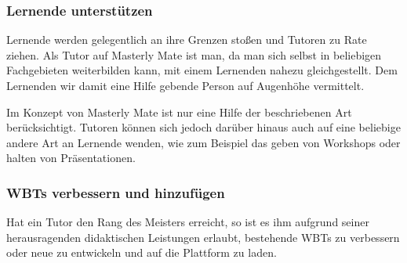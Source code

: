 \subsubsection{Lernende unterstützen}
Lernende werden gelegentlich an ihre Grenzen stoßen und Tutoren zu Rate ziehen.
Als Tutor auf Masterly Mate ist man, da man sich selbst in beliebigen
Fachgebieten weiterbilden kann, mit einem Lernenden nahezu gleichgestellt. Dem
Lernenden wir damit eine Hilfe gebende Person auf Augenhöhe vermittelt. 

Im Konzept von Masterly Mate ist nur eine Hilfe der beschriebenen Art
berücksichtigt. Tutoren können sich jedoch darüber hinaus auch auf eine
beliebige andere Art an Lernende wenden, wie zum Beispiel das geben von
Workshops oder halten von Präsentationen.

\subsubsection{WBTs verbessern und hinzufügen}
Hat ein Tutor den Rang des Meisters erreicht, so ist es ihm aufgrund seiner
herausragenden didaktischen Leistungen erlaubt, bestehende WBTs zu verbessern
oder neue zu entwickeln und auf die Plattform zu laden.